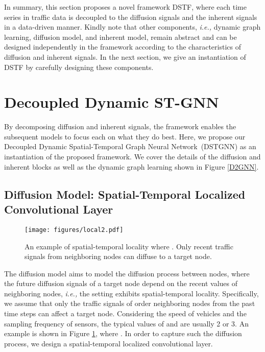 \documentclass[sigconf, nonacm]{acmart}
\newcommand{\ie}{\textit{i.e.,}\xspace}
\begin{document}
{\color{black}
In summary, this section proposes a novel framework DSTF, where each time series in traffic data is decoupled to the diffusion signals and the inherent signals in a data-driven manner.
Kindly note that other components, \ie dynamic graph learning, diffusion model, and inherent model, remain abstract and can be designed independently in the framework according to the characteristics of diffusion and inherent signals.
In the next section, we give an instantiation of DSTF by carefully designing these components.
} \section{Decoupled Dynamic ST-GNN}
\label{Section5}
By decomposing {\color{black}diffusion and inherent} signals, the framework enables the {\color{black}subsequent} models to focus each on what they do best.
Here, we propose our Decoupled Dynamic Spatial-Temporal Graph Neural Network~(DSTGNN) {\color{black}as an instantiation of the proposed framework}.
We cover the details of the {\color{black}diffusion and inherent blocks as well as the dynamic graph learning} shown in Figure \ref{D2GNN}.

\subsection{{\color{black}Diffusion Model: Spatial-Temporal} Localized {\color{black}Convolutional} Layer}
\begin{figure}[h]
  \centering
  \setlength{\abovecaptionskip}{0.2cm}
\texttt{[image: figures/local2.pdf]}
  \caption{An example of spatial-temporal locality {\color{black}where }. Only recent traffic signals from neighboring nodes can diffuse to a target node.}
  \label{locality}
\end{figure}
The {\color{black}diffusion} model aims to model {\color{black}the diffusion process between nodes, where the future diffusion signals of a target node depend on the recent values of neighboring nodes}, \ie the setting exhibits spatial-temporal locality.
Specifically, we assume that only {\color{black}the traffic signals of}  order neighboring nodes {\color{black}from the past  time steps} can affect a target node.
Considering the {\color{black} speed of vehicles} and the sampling frequency of sensors, the typical values of  and  are usually 2 or 3.
An example is shown in Figure \ref{locality}, where .
In order to capture {\color{black}such the diffusion process, we design a spatial-temporal localized {\color{black}convolutional} layer.}
\end{document}
